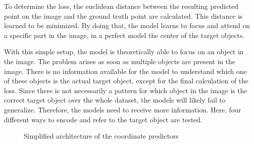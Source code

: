 To determine the loss, the euclidean distance between the resulting predicted point on the image and the ground truth point are calculated.
This distance is learned to be minimized.
By doing that, the model learns to focus and attend on a specific part in the image, in a perfect model the center of the target objects.

With this simple setup, the model is theoretically able to focus on an object in the image.
The problem arises as soon as multiple objects are present in the image.
There is no information available for the model to understand which one of these objects is the actual target object, except for the final calculation of the loss.
Since there is not necessarily a pattern for which object in the image is the correct target object over the whole dataset, the models will likely fail to generalize.
Therefore, the models need to receive more information.
Here, four different ways to encode and refer to the target object are tested.

\begin{figure}[ht]
    \centering
    \caption{Simplified architecture of the coordinate predictors}
\end{figure}

